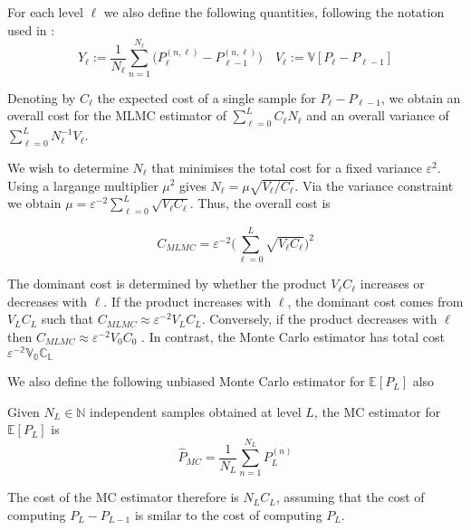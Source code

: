 For each level $\ell$ we also define the following quantities, following the notation
used in \cite{giles2015multilevel}:
\begin{equation*}
    Y_\ell := \frac{1}{N_\ell} \sum_{n=1}^{N_\ell}
    \big( P_\ell^{(n,\ell)} - P_{\ell-1}^{(n,\ell)} \big) 
    \quad
    V_\ell :=  \mathbb{V}[P_\ell - P_{\ell - 1}]
\end{equation*}

Denoting by $C_\ell$ the expected cost of a single sample for $P_\ell - P_{\ell - 1}$,
we obtain an overall cost for the MLMC estimator of $\sum_{\ell=0}^L C_\ell N_\ell$ and 
an overall variance of $\sum_{\ell=0}^L N_\ell^{-1} V_\ell$.

We wish to determine $N_\ell$ that minimises the total cost for a fixed variance $\varepsilon^2$.
Using a largange multiplier $\mu^2$ gives $N_\ell = \mu \sqrt{V_\ell / C_\ell}$. 
Via the variance constraint we obtain $\mu = \varepsilon^{-2} \sum_{\ell=0}^L\sqrt{V_\ell C_\ell}$. 
Thus, the overall cost is

\begin{equation}\label{eq:mlmc_tot_cost}
    C_{MLMC} = \varepsilon^{-2}\big(\sum_{\ell=0}^L\sqrt{V_\ell C_\ell}\big)^2
\end{equation}

The dominant cost is determined by whether the product $V_\ell C_\ell$ increases or decreases with 
$\ell$. If the product increases with $\ell$, the dominant cost comes from $V_L C_L$ such that 
$C_{MLMC} \approx \varepsilon^{-2} V_L C_L$. Conversely, if the product decreases with $\ell$ 
then $C_{MLMC} \approx \varepsilon^{-2}V_0C_0$ \cite{giles2015multilevel}. In contrast, 
the Monte Carlo estimator has total cost $\mathbb{\varepsilon^{-2}V_0C_L}$

We also define the following unbiased Monte Carlo estimator for $\mathbb{E}[P_L]$ also

\begin{definition}[MC Estimator]\label{def:mc_estimator}
    Given $N_L \in \mathbb{N}$ independent samples obtained at level $L$, the MC estimator for 
    $\mathbb{E}[P_L]$ is
    \[
    \hat{P}_{MC} = \frac{1}{N_L}\sum_{n=1}^{N_L}P_L^{(n)}
    \]
\end{definition}

The cost of the MC estimator therefore is $N_L C_L$, assuming that the cost of computing 
$P_L - P_{L-1}$ is smilar to the cost of computing $P_L$. 


